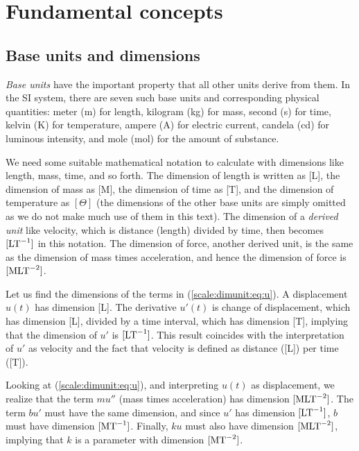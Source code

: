 \documentclass[graybox,envcountchap,sectrefs,final]{svmonodo}
\begin{document}
\section{Fundamental concepts}

\subsection{Base units and dimensions}



\emph{Base units} have the important property that all other units derive
from them. In the SI system,
there are seven such base units and corresponding
physical quantities:
meter (m) for length,
kilogram (kg) for mass,
second (s) for time,
kelvin (K) for temperature,
ampere (A) for electric current,
candela (cd) for luminous intensity, and
mole (mol) for the amount of substance.

We need some suitable mathematical notation to calculate with
dimensions like length, mass, time, and so forth.  The dimension of
length is written as [L], the dimension of mass as [M], the dimension
of time as [T], and the dimension of temperature as $[\Theta]$ (the
dimensions of the other base units are simply omitted as we do not make
much use of them in this text).
The dimension of a \emph{derived unit} like velocity, which
is distance (length) divided by time, then becomes $[\hbox{LT}^{-1}]$
in this notation.  The dimension of force, another derived unit, is
the same as the dimension of mass times acceleration, and hence the
dimension of force is $[\hbox{MLT}^{-2}]$.

Let us find the dimensions of the terms in (\ref{scale:dimunit:eq:u}).
A displacement $u(t)$ has dimension [L]. The derivative $u'(t)$ is
change of displacement, which has dimension [L], divided by a time
interval, which has dimension [T], implying that the dimension of $u'$
is $[\hbox{LT}^{-1}]$. This result coincides with the interpretation of
$u'$ as velocity and the fact that velocity is defined as distance
([L]) per time ([T]).

Looking at (\ref{scale:dimunit:eq:u}), and interpreting $u(t)$ as
displacement, we realize that the term $mu''$ (mass times
acceleration) has dimension $[\hbox{MLT}^{-2}]$.  The term $bu'$ must
have the same dimension, and since $u'$ has dimension
$[\hbox{LT}^{-1}]$, $b$ must have dimension $[\hbox{MT}^{-1}]$.
Finally, $ku$ must also have dimension $[\hbox{MLT}^{-2}]$, implying
that $k$ is a parameter with dimension $[\hbox{MT}^{-2}]$.
\end{document}

